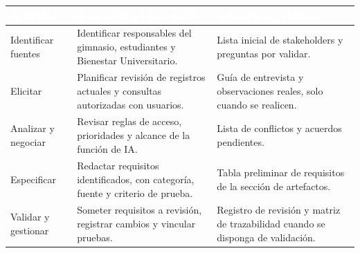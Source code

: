 \begin{center}
\small
\begin{tabularx}{\textwidth}{|>{\raggedright\arraybackslash}p{2.45cm}|L|L|}
\hline
{}\textcolor{white}{\textbf{Actividad}} & \textcolor{white}{\textbf{Aplicación a UteqFit-AI}} & \textcolor{white}{\textbf{Artefacto o evidencia}} \\ \hline
Identificar fuentes & Identificar responsables del gimnasio, estudiantes y Bienestar Universitario. & Lista inicial de stakeholders y preguntas por validar. \\ \hline
Elicitar & Planificar revisión de registros actuales y consultas autorizadas con usuarios. & Guía de entrevista y observaciones reales, solo cuando se realicen. \\ \hline
Analizar y negociar & Revisar reglas de acceso, prioridades y alcance de la función de IA. & Lista de conflictos y acuerdos pendientes. \\ \hline
Especificar & Redactar requisitos identificados, con categoría, fuente y criterio de prueba. & Tabla preliminar de requisitos de la sección de artefactos. \\ \hline
Validar y gestionar & Someter requisitos a revisión, registrar cambios y vincular pruebas. & Registro de revisión y matriz de trazabilidad cuando se disponga de validación. \\ \hline
\end{tabularx}
\end{center}
